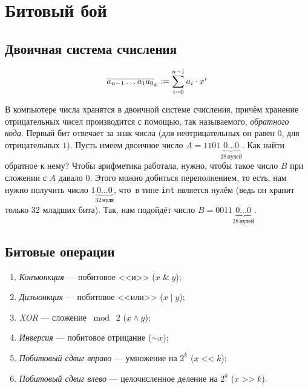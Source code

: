 \section{Битовый бой}

\subsection{Двоичная система счисления}

\begin{definition}
    \[
        \overline{a_{n - 1}\ldots a_1 a_0}_x \vcentcolon = \sum\limits_{i = 0}^{n - 1} a_i\cdot x^i
    \]
\end{definition}

В компьютере числа хранятся в двоичной системе счисления, причём хранение отрицательных чисел производится с помощью, так называемого, \textit{обратного кода}. Первый бит отвечает за знак числа (для неотрицательных он равен $0$, для отрицательных $1$). Пусть имеем двоичное число  $A = 1101\underbrace{0\ldots0}_{28\, \text{нулей}}$. Как найти обратное к нему? Чтобы арифметика работала, нужно, чтобы такое число $B$ при сложении с $A$ давало $0$. Этого можно добиться переполнением, то есть, нам нужно получить число $1\underbrace{0\ldots0}_{32\, \text{нуля}}$, что~в типе \texttt{int} является нулём (ведь он хранит только 32 младших бита). Так, нам подойдёт число $B = 0011\underbrace{0\ldots0}_{28\,\text{нулей}}$.

\subsection{Битовые операции}

\begin{definition}
    \begin{enumerate}[nolistsep]
        \item \textit{Конъюнкция} --- побитовое <<и>> ($x\;\&\;y$);
        \item \textit{Дизъюнкция} --- побитовое <<или>> ($x\;\vert\;y$);
        \item \textit{XOR} --- сложение $\bmod\;2$ ($x \wedge y$);
        \item \textit{Инверсия} --- побитовое отрицание ($\sim x$);
        \item \textit{Побитовый сдвиг вправо} --- умножение на $2^k$ ($x\;\texttt{<<}\;k$);
        \item \textit{Побитовый сдвиг влево} --- целочисленное деление на $2^k$ ($x\;\texttt{>>}\;k$).
    \end{enumerate}
\end{definition}

